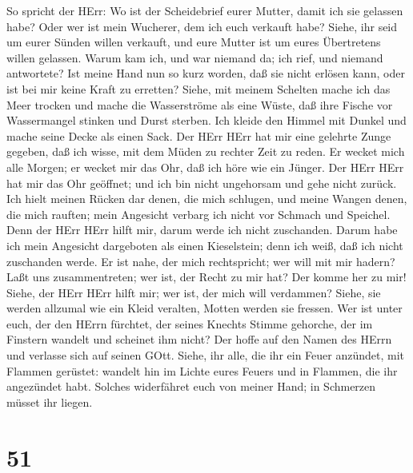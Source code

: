  So spricht der HErr: Wo ist der Scheidebrief eurer Mutter,
damit ich sie gelassen habe? Oder wer ist mein Wucherer, dem ich euch
verkauft habe? Siehe, ihr seid um eurer Sünden willen verkauft, und eure
Mutter ist um eures Übertretens willen gelassen.  Warum kam
ich, und war niemand da; ich rief, und niemand antwortete? Ist meine
Hand nun so kurz worden, daß sie nicht erlösen kann, oder ist bei mir
keine Kraft zu erretten? Siehe, mit meinem Schelten mache ich das Meer
trocken und mache die Wasserströme als eine Wüste, daß ihre Fische vor
Wassermangel stinken und Durst sterben.  Ich kleide den
Himmel mit Dunkel und mache seine Decke als einen Sack.  Der
HErr HErr hat mir eine gelehrte Zunge gegeben, daß ich wisse, mit dem
Müden zu rechter Zeit zu reden. Er wecket mich alle Morgen; er wecket
mir das Ohr, daß ich höre wie ein Jünger.  Der HErr HErr hat
mir das Ohr geöffnet; und ich bin nicht ungehorsam und gehe nicht
zurück.  Ich hielt meinen Rücken dar denen, die mich
schlugen, und meine Wangen denen, die mich rauften; mein Angesicht
verbarg ich nicht vor Schmach und Speichel.  Denn der HErr
HErr hilft mir, darum werde ich nicht zuschanden. Darum habe ich mein
Angesicht dargeboten als einen Kieselstein; denn ich weiß, daß ich nicht
zuschanden werde.  Er ist nahe, der mich rechtspricht; wer
will mit mir hadern? Laßt uns zusammentreten; wer ist, der Recht zu mir
hat? Der komme her zu mir!  Siehe, der HErr HErr hilft mir;
wer ist, der mich will verdammen? Siehe, sie werden allzumal wie ein
Kleid veralten, Motten werden sie fressen.  Wer ist unter
euch, der den HErrn fürchtet, der seines Knechts Stimme gehorche, der im
Finstern wandelt und scheinet ihm nicht? Der hoffe auf den Namen des
HErrn und verlasse sich auf seinen GOtt.  Siehe, ihr alle,
die ihr ein Feuer anzündet, mit Flammen gerüstet: wandelt hin im Lichte
eures Feuers und in Flammen, die ihr angezündet habt. Solches
widerfähret euch von meiner Hand; in Schmerzen müsset ihr liegen.

\hypertarget{section-50}{%
\section{51}\label{section-50}}

